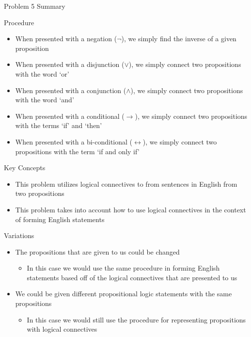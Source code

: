 \begin{summary}{Problem 5 Summary}
    \begin{statement}{Procedure}
        \begin{itemize}
            \item When presented with a negation ($\neg$), we simply find the inverse of a given proposition
            \item When presented with a disjunction ($\vee$), we simply connect two propositions with the word `or'
            \item When presented with a conjunction ($\wedge$), we simply connect two propositions with the word `and'
            \item When presented with a conditional ($\rightarrow$), we simply connect two propositions with the terms `if' and `then'
            \item When presented with a bi-conditional ($\leftrightarrow$), we simply connect two propositions with the term `if and only if'
        \end{itemize}
    \end{statement}
    \begin{statement}{Key Concepts}
        \begin{itemize}
            \item This problem utilizes logical connectives to from sentences in English from two propositions
            \item This problem takes into account how to use logical connectives in the context of forming English statements
        \end{itemize}
    \end{statement}
    \begin{statement}{Variations}
        \begin{itemize}
            \item The propositions that are given to us could be changed
            \begin{itemize}
                \item In this case we would use the same procedure in forming English statements based off of the logical connectives that are presented to us
            \end{itemize}
            \item We could be given different propositional logic statements with the same propositions
            \begin{itemize}
                \item In this case we would still use the procedure for representing propositions with logical connectives 

\end{itemize}
\end{itemize}
\end{statement}
\end{summary}
